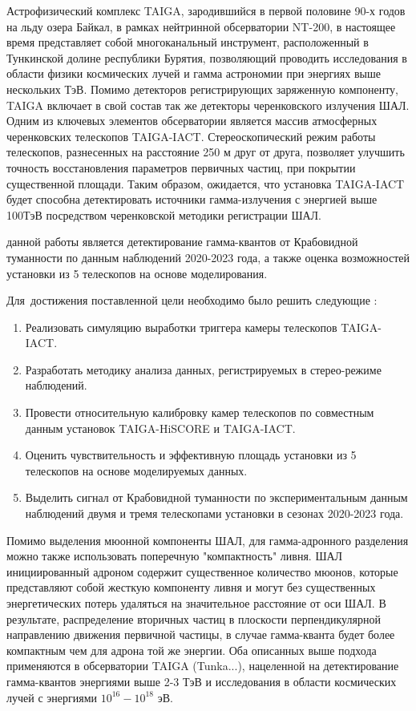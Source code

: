 Астрофизический комплекс TAIGA, зародившийся в первой половине 90-х годов на льду озера Байкал, в рамках нейтринной обсерватории NT-200\cite{NT200}, в настоящее время представляет собой многоканальный инструмент, расположенный в Тункинской долине республики Бурятия, позволяющий проводить исследования в области физики космических лучей и гамма астрономии при энергиях выше нескольких ТэВ. Помимо детекторов регистрирующих заряженную компоненту, TAIGA включает в свой состав так же детекторы черенковского излучения ШАЛ.
Одним из ключевых элементов обсерватории является массив атмосферных черенковских телескопов TAIGA-IACT. Стереоскопический режим работы телескопов, разнесенных на расстояние 250 м друг от друга, позволяет улучшить точность восстановления параметров первичных частиц, при покрытии существенной площади. Таким образом, ожидается, что установка TAIGA-IACT будет способна детектировать источники гамма-излучения с энергией выше 100ТэВ посредством черенковской методики регистрации ШАЛ.

{\aim} данной работы является детектирование гамма-квантов от Крабовидной туманности по данным наблюдений 2020-2023 года, а также оценка возможностей установки из 5 телескопов на основе моделирования. 

Для~достижения поставленной цели необходимо было решить следующие {\tasks}:
\begin{enumerate}[beginpenalty=10000] %
	\item Реализовать симуляцию выработки триггера камеры телескопов TAIGA-IACT.
	\item Разработать методику анализа данных, регистрируемых в стерео-режиме наблюдений.
	\item Провести относительную калибровку камер телескопов по совместным данным установок TAIGA-HiSCORE и TAIGA-IACT.
	\item Оценить чувствительность и эффективную площадь установки из 5 телескопов на основе моделируемых данных.
	\item Выделить сигнал от Крабовидной туманности по экспериментальным данным наблюдений двумя и тремя телескопами установки в сезонах 2020-2023 года.
\end{enumerate}

Помимо выделения мюонной компоненты ШАЛ, для гамма-адронного разделения можно также использовать поперечную "компактность" ливня. ШАЛ инициированный адроном содержит существенное количество мюонов, которые представляют собой жесткую компоненту ливня и могут без существенных энергетических потерь удаляться на значительное расстояние от оси ШАЛ. В результате, распределение вторичных частиц в плоскости перпендикулярной направлению движения первичной частицы, в случае гамма-кванта будет более компактным чем для адрона той же энергии. Оба описанных выше подхода применяются в обсерватории TAIGA (Tunka...), нацеленной на детектирование гамма-квантов энергиями выше 2-3 ТэВ и исследования в области космических лучей с энергиями $10^{16} - 10^{18}$ эВ.

